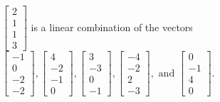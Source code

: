 \begin{exercise}
\begin{exerciseStatement}
  \end{exerciseStatement}
  \begin{exerciseAnswer}
   \(\left[\begin{array}{c}
2 \\
1 \\
1 \\
3
\end{array}\right]\) 
  	 is  
	a linear combination of the vectors \(\left[\begin{array}{c}
-1 \\
0 \\
-2 \\
-2
\end{array}\right] , \left[\begin{array}{c}
4 \\
-2 \\
-1 \\
0
\end{array}\right] , \left[\begin{array}{c}
3 \\
-3 \\
0 \\
-1
\end{array}\right] , \left[\begin{array}{c}
-4 \\
-2 \\
2 \\
-3
\end{array}\right] , \text{ and } \left[\begin{array}{c}
0 \\
-1 \\
4 \\
0
\end{array}\right]\).

	
  


  \end{exerciseAnswer}
\end{exercise}